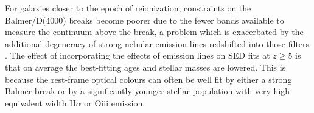     
For galaxies closer to the epoch of reionization, constraints on the Balmer/D(4000) breaks become poorer due to the fewer bands available to measure the continuum above the break, a problem which is exacerbated by the additional degeneracy of strong nebular emission lines redshifted into those filters \citep{2009A&A...502..423S,2010A&A...515A..73S}. The effect of incorporating the effects of emission lines on SED fits at $z \geq 5$ is that on average the best-fitting ages and stellar masses are lowered. This is because the rest-frame optical colours can often be well fit by either a strong Balmer break or by a significantly younger stellar population with very high equivalent width H$\alpha$ or {\sc Oiii} emission. 


